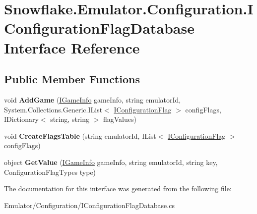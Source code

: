 \hypertarget{interface_snowflake_1_1_emulator_1_1_configuration_1_1_i_configuration_flag_database}{}\section{Snowflake.\+Emulator.\+Configuration.\+I\+Configuration\+Flag\+Database Interface Reference}
\label{interface_snowflake_1_1_emulator_1_1_configuration_1_1_i_configuration_flag_database}
\subsection*{Public Member Functions}
\begin{DoxyCompactItemize}
\item 
\hypertarget{interface_snowflake_1_1_emulator_1_1_configuration_1_1_i_configuration_flag_database_aa17e14a4e8c86444c699e81663622cf3}{}void {\bfseries Add\+Game} (\hyperlink{interface_snowflake_1_1_game_1_1_i_game_info}{I\+Game\+Info} game\+Info, string emulator\+Id, System.\+Collections.\+Generic.\+I\+List$<$ \hyperlink{interface_snowflake_1_1_emulator_1_1_configuration_1_1_i_configuration_flag}{I\+Configuration\+Flag} $>$ config\+Flags, I\+Dictionary$<$ string, string $>$ flag\+Values)\label{interface_snowflake_1_1_emulator_1_1_configuration_1_1_i_configuration_flag_database_aa17e14a4e8c86444c699e81663622cf3}

\item 
\hypertarget{interface_snowflake_1_1_emulator_1_1_configuration_1_1_i_configuration_flag_database_ab3c4134d6867abf9cf26ad9f38606187}{}void {\bfseries Create\+Flags\+Table} (string emulator\+Id, I\+List$<$ \hyperlink{interface_snowflake_1_1_emulator_1_1_configuration_1_1_i_configuration_flag}{I\+Configuration\+Flag} $>$ config\+Flags)\label{interface_snowflake_1_1_emulator_1_1_configuration_1_1_i_configuration_flag_database_ab3c4134d6867abf9cf26ad9f38606187}

\item 
\hypertarget{interface_snowflake_1_1_emulator_1_1_configuration_1_1_i_configuration_flag_database_acfac884529a8b92619519bf51cb96633}{}object {\bfseries Get\+Value} (\hyperlink{interface_snowflake_1_1_game_1_1_i_game_info}{I\+Game\+Info} game\+Info, string emulator\+Id, string key, Configuration\+Flag\+Types type)\label{interface_snowflake_1_1_emulator_1_1_configuration_1_1_i_configuration_flag_database_acfac884529a8b92619519bf51cb96633}

\end{DoxyCompactItemize}


The documentation for this interface was generated from the following file\+:\begin{DoxyCompactItemize}
\item 
Emulator/\+Configuration/I\+Configuration\+Flag\+Database.\+cs\end{DoxyCompactItemize}
